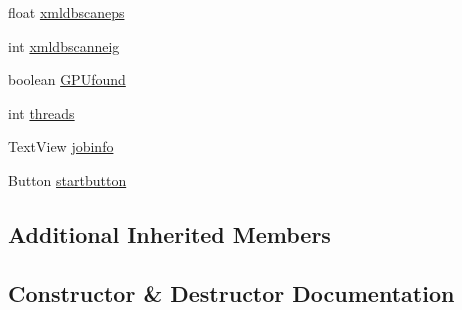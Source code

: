 \begin{DoxyCompactItemize}
\item 
float \mbox{\hyperlink{classcom_1_1example_1_1dmocl_1_1submitjobs_a1d9e059d53091e0f4b43e3fac680512a}{xmldbscaneps}}
\item 
int \mbox{\hyperlink{classcom_1_1example_1_1dmocl_1_1submitjobs_ad0c872b86105948bbb46f139342c5efc}{xmldbscanneig}}
\item 
boolean \mbox{\hyperlink{classcom_1_1example_1_1dmocl_1_1submitjobs_a5814796a59a429aff9232b422f89c7c1}{G\+P\+Ufound}}
\item 
int \mbox{\hyperlink{classcom_1_1example_1_1dmocl_1_1submitjobs_a6fdac4319ee62e10ad6fcfc9307ac8bb}{threads}}
\item 
Text\+View \mbox{\hyperlink{classcom_1_1example_1_1dmocl_1_1submitjobs_a032c78e186b38cd5e0fb51c2af3fdc4c}{jobinfo}}
\item 
Button \mbox{\hyperlink{classcom_1_1example_1_1dmocl_1_1submitjobs_aea14d6db768f605a2e9bbea50e297d1b}{startbutton}}
\end{DoxyCompactItemize}
\subsection*{Additional Inherited Members}


\subsection{Constructor \& Destructor Documentation}
\mbox{\label{classcom_1_1example_1_1dmocl_1_1submitjobs_a482225e911b94fb9ffd69233fc457800}} 
